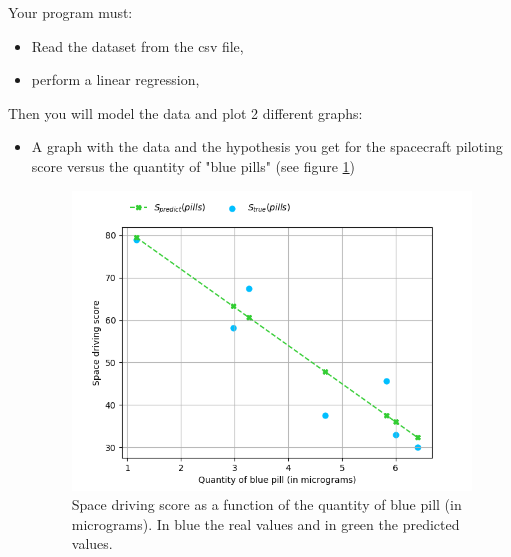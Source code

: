 \documentclass{42-en}
\begin{document}
Your program must:
\begin{itemize}
  \item Read the dataset from the csv file,
  \item perform a linear regression, 
\end{itemize}
\newpage
Then you will model the data and plot 2 different graphs:
\begin{itemize}
  \item A graph with the data and the hypothesis you get for the spacecraft piloting score versus the quantity of "blue pills" (see figure \ref{best fit for score vs micrograms})
  \begin{figure}[!h]
    \centering
    \includegraphics[scale=0.6]{assets/ex04_score_vs_bluepills.png}
    \caption{Space driving score as a function of the quantity of blue pill (in micrograms). In blue the real values and in green the predicted values.}
    \label{best fit for score vs micrograms}
  \end{figure}
  

\end{itemize}
\end{document}
